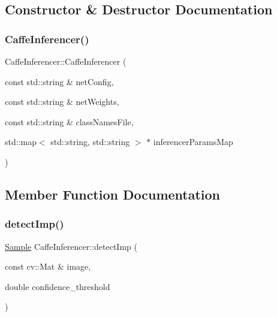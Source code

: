 \subsection{Constructor \& Destructor Documentation}
\mbox{\label{class_caffe_inferencer_a061bf73e8736135e292154d9fa50d13d}} 
\subsubsection{\texorpdfstring{Caffe\+Inferencer()}{CaffeInferencer()}}
{\footnotesize\ttfamily Caffe\+Inferencer\+::\+Caffe\+Inferencer (\begin{DoxyParamCaption}\item[{const std\+::string \&}]{net\+Config,  }\item[{const std\+::string \&}]{net\+Weights,  }\item[{const std\+::string \&}]{class\+Names\+File,  }\item[{std\+::map$<$ std\+::string, std\+::string $>$ $\ast$}]{inferencer\+Params\+Map }\end{DoxyParamCaption})}



\subsection{Member Function Documentation}
\mbox{\label{class_caffe_inferencer_a898f6d0e7106ac663a6c26ecdf799502}} 
\subsubsection{\texorpdfstring{detect\+Imp()}{detectImp()}}
{\footnotesize\ttfamily \hyperlink{struct_sample}{Sample} Caffe\+Inferencer\+::detect\+Imp (\begin{DoxyParamCaption}\item[{const cv\+::\+Mat \&}]{image,  }\item[{double}]{confidence\+\_\+threshold }\end{DoxyParamCaption})\hspace{0.3cm}{\ttfamily [virtual]}}



